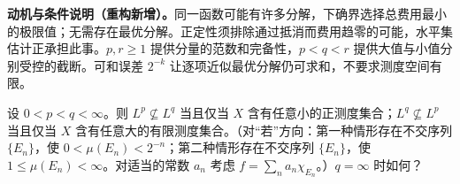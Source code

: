 \documentclass[../../main.tex]{subfiles}
\begin{document}
\begin{remark}
\textbf{动机与条件说明（重构新增）。}同一函数可能有许多分解，下确界选择总费用最小的极限值；无需存在最优分解。正定性须排除通过抵消而费用趋零的可能，水平集估计正承担此事。$p,r\geqslant1$ 提供分量的范数和完备性，$p<q<r$ 提供大值与小值分别受控的截断。可和误差 $2^{-k}$ 让逐项近似最优分解仍可求和，不要求测度空间有限。
\end{remark}
\begin{exercise}\label{exercise:ch06-lp-inclusion-criterion}
设 $0<p<q<\infty$。则 $L^p\not\subseteq L^q$ 当且仅当 $X$ 含有任意小的正测度集合；$L^q\not\subseteq L^p$ 当且仅当 $X$ 含有任意大的有限测度集合。（对“若”方向：第一种情形存在不交序列 $\{E_n\}$，使 $0<\mu(E_n)<2^{-n}$；第二种情形存在不交序列 $\{E_n\}$，使 $1\leqslant\mu(E_n)<\infty$。对适当的常数 $a_n$ 考虑 $f=\sum_na_n\chi_{E_n}$。）$q=\infty$ 时如何？
\end{exercise}
\end{document}
